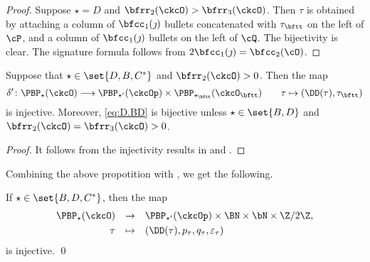 \documentclass[ssunip]{subfiles}
\begin{document}
\begin{proof}
{    Suppose $\star =  D$ and $\bfrr_{2}(\ckcO)>\bfrr_{3}(\ckcO)$.
    Then $\tau$ is obtained by attaching a column of $\bfcc_{1}(\jmath)$
    bullets concatenated with $\tau_{\bftt}$ on the left of $\cP$, and a column of  $\bfcc_{1}(\jmath)$
    bullets on the left of $\cQ$. The bijectivity is clear. The
    signature formula follows from $2\bfcc_{1}(\jmath)  = \bfcc_{2}(\cO)$.

  }
\end{proof}


\begin{prop}\label{cor:D.inj1}
Suppose that $\star \in \set{D,B,C^*}$ and $\bfrr_{2}(\ckcO)>0$.
Then the map
\begin{equation}\label{eq:D.BD}
  \delta' \colon \PBP_{\star}(\ckcO)\longrightarrow
   \PBP_{\star'}(\ckcOp)\times \PBP_{\star_\bftt}(\ckcO_\bftt)
   \qquad \tau \mapsto (\DD(\tau), \tau_\bftt)
\end{equation}
is injective. Moreover, \eqref{eq:D.BD} is bijective
unless $\star\in \set{B,D}$ and $\bfrr_2(\ckcO)=\bfrr_3(\ckcO)>0$.
\end{prop}
\begin{proof}
It follows from the injectivity results in  and .
\end{proof}

Combining the above propotition with , we get the following.
\begin{cor}\label{cor:dpinj}
If $\star \in \set{B, D,C^*}$, then the map
\begin{equation}
  \begin{array}{rcl}
   \PBP_{\star}(\ckcO)&\rightarrow&
   \PBP_{\star'}(\ckcOp)\times \BN\times \bN\times \Z/2\Z, \smallskip\\
   \tau& \mapsto & (\DD(\tau), p_\tau, q_\tau, \varepsilon_\tau)
   \end{array}
\end{equation}
is injective. \qed
\end{cor}
\end{document}
